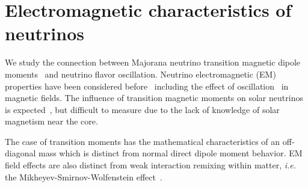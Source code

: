 \section{Electromagnetic characteristics of neutrinos}
\label{sec:numoment}
We study the connection between Majorana neutrino transition magnetic dipole moments~\citep{Fujikawa:1980yx,Shrock:1980vy,Shrock:1982sc} and neutrino flavor oscillation. Neutrino electromagnetic (EM) properties have been considered before~\citep{Schechter:1981hw,Giunti:2014ixa,Popov:2019nkr,Chukhnova:2019oum} including the effect of oscillation~\citep{Lim:1987tk,Akhmedov:1988uk,Pal:1991pm,Elizalde:2004mw,Akhmedov:2022txm} in magnetic fields. The influence of transition magnetic moments on solar neutrinos is expected~\citep{Martinez-Mirave:2023fyb}, but difficult to measure due to the lack of knowledge of solar magnetism near the core.

The case of transition moments has the mathematical characteristics of an off-diagonal mass which is distinct from normal direct dipole moment behavior. EM field effects are also distinct from weak interaction remixing within matter, {\it i.e.\/} the Mikheyev-Smirnov-Wolfenstein effect~\citep{Wolfenstein:1977ue,Mikheyev:1985zog,Smirnov:2003da}.




